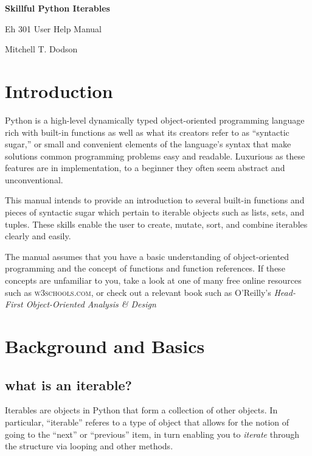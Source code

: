 \documentclass[12pt]{article}
\begin{document}
\vspace*{10em}
\begin{center}
	\Huge\bf
	Skillful Python Iterables
\end{center}
\vspace{1em}
\begin{center}
	\large
	Eh 301 User Help Manual

	Mitchell T. Dodson
\end{center}

\newpage

\section{Introduction}
\label{introduction}

Python is a high-level dynamically typed object-oriented programming language rich with built-in functions as well as what its creators refer to as ``syntactic sugar,'' or small and convenient elements of the language's syntax that make solutions common programming problems easy and readable. Luxurious as these features are in implementation, to a beginner they often seem abstract and unconventional.

This manual intends to provide an introduction to several built-in functions and pieces of syntactic sugar which pertain to iterable objects such as lists, sets, and tuples. These skills enable the user to create, mutate, sort, and combine iterables clearly and easily.

The manual assumes that you have a basic understanding of object-oriented programming and the concept of functions and function references. If these concepts are unfamiliar to you, take a look at one of many free online resources such as \textsc{w3schools.com}, or check out a relevant book such as O'Reilly's \textit{Head-First Object-Oriented Analysis \& Design}

\newpage
\section{Background and Basics}
\label{background}

\subsection{what is an iterable?}
\label{what is an iterable?}

Iterables are objects in Python that form a collection of other objects. In particular, ``iterable'' referes to a type of object that allows for the notion of going to the ``next'' or ``previous'' item, in turn enabling  you to \textit{iterate} through the structure via looping and other methods.
\end{document}

